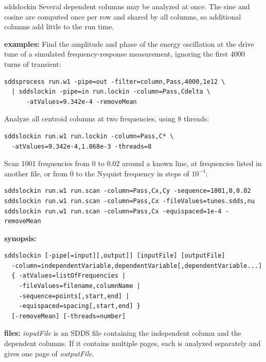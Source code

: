 \begin{sddsprog}{sddslockin}
  Several dependent columns may be analyzed at once.  The sine and cosine are computed once per row and shared by all
  columns, so additional columns add little to the run time.
  \item \textbf{examples:}
  Find the amplitude and phase of the energy oscillation at the drive tune of a simulated frequency-response
  measurement, ignoring the first 4000 turns of transient:
\begin{verbatim}
sddsprocess run.w1 -pipe=out -filter=column,Pass,4000,1e12 \
  | sddslockin -pipe=in run.lockin -column=Pass,Cdelta \
      -atValues=9.342e-4 -removeMean
\end{verbatim}
  Analyze all centroid columns at two frequencies, using 8 threads:
\begin{verbatim}
sddslockin run.w1 run.lockin -column=Pass,C* \
  -atValues=9.342e-4,1.868e-3 -threads=8
\end{verbatim}
  Scan 1001 frequencies from 0 to 0.02 around a known line, at frequencies listed in another file, or from 0 to
  the Nyquist frequency in steps of $10^{-4}$:
\begin{verbatim}
sddslockin run.w1 run.scan -column=Pass,Cx,Cy -sequence=1001,0,0.02
sddslockin run.w1 run.scan -column=Pass,Cx -fileValues=tunes.sdds,nu
sddslockin run.w1 run.scan -column=Pass,Cx -equispaced=1e-4 -removeMean
\end{verbatim}
  \item \textbf{synopsis:}
\begin{verbatim}
sddslockin [-pipe[=input][,output]] [inputFile] [outputFile]
  -column=independentVariable,dependentVariable[,dependentVariable...]
  { -atValues=listOfFrequencies |
    -fileValues=filename,columnName |
    -sequence=points[,start,end] |
    -equispaced=spacing[,start,end] }
  [-removeMean] [-threads=number]
\end{verbatim}
  \item \textbf{files:}
  \emph{inputFile} is an SDDS file containing the independent column and the dependent columns.  If it contains
  multiple pages, each is analyzed separately and gives one page of \emph{outputFile}.


\end{sddsprog}
